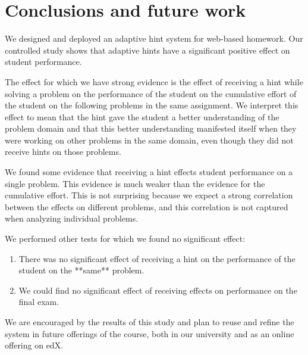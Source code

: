 \documentclass{llncs2e/llncs}
\begin{document}
\section{Conclusions and future work}

We designed and deployed an adaptive hint system for web-based homework. Our controlled study shows that adaptive hints have a significant positive effect on student performance.

The effect for which we have strong evidence is the effect of receiving a hint while solving a problem on the performance of the student on the cumulative effort of the student on the following problems in the same assignment. We interpret this effect to mean that the hint gave the student a better understanding of the problem domain and that this better understanding manifested itself when they were working on other problems in the same domain, even though they did not receive hints on those problems.

We found some evidence that receiving a hint effects student performance on a single problem. This evidence is much weaker than the evidence for the cumulative effort. This is not surprising because we expect a strong correlation between the effects on different problems, and this correlation is not captured when analyzing individual problems.

We performed other tests for which we found no significant effect:
\begin{enumerate}
\item There was no significant effect of receiving a hint on the
  performance of the student on the **same** problem.
\item We could find no significant effect of receiving effects on
  performance on the final exam.
\end{enumerate}

We are encouraged by the results of this study and plan to reuse and refine the system in future offerings of the course, both in our
university and as an online offering on edX.



\end{document}
